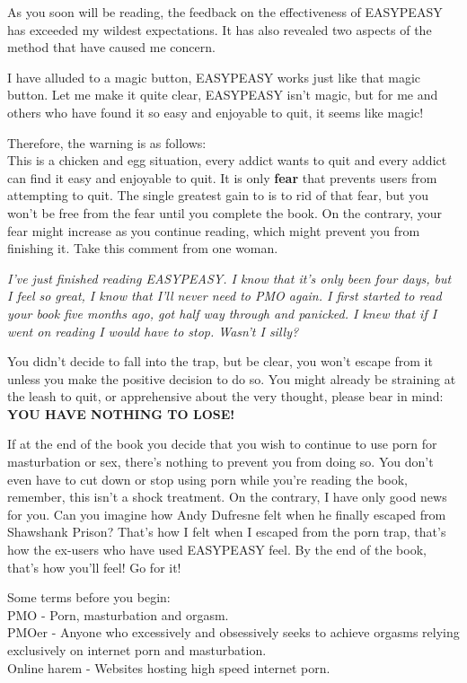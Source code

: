 \documentclass[easypeasy.tex]{subfiles}
\begin{document}
As you soon will be reading, the feedback on the effectiveness of EASYPEASY has exceeded my wildest expectations. It has also revealed two aspects of the method that have caused me concern. 

I have alluded to a magic button, EASYPEASY works just like that magic button. Let me make it quite clear, EASYPEASY isn't magic, but for me and others who have found it so easy and enjoyable to quit, it seems like magic!

Therefore, the warning is as follows:\\
This is a chicken and egg situation, every addict wants to quit and every addict can find it easy and enjoyable to quit. It is only \textbf{fear} that prevents users from attempting to quit. The single greatest gain to is to rid of that fear, but you won't be free from the fear until you complete the book. On the contrary, your fear might increase as you continue reading, which might prevent you from finishing it. Take this comment from one woman.

\textit{\textit{I've just finished reading EASYPEASY. I know that it's only been four days, but I feel so great, I know that I'll never need to PMO again. I first started to read your book five months ago, got half way through and panicked. I knew that if I went on reading I would have to stop. Wasn't I silly?}}

You didn't decide to fall into the trap, but be clear, you won't escape from it unless you make the positive decision to do so. You might already be straining at the leash to quit, or apprehensive about the very thought, please bear in mind: 
\textbf{YOU HAVE NOTHING TO LOSE!}

If at the end of the book you decide that you wish to continue to use porn for masturbation or sex, there's nothing to prevent you from doing so. You don't even have to cut down or stop using porn while you're reading the book, remember, this isn't a shock treatment. On the contrary, I have only good news for you. Can you imagine how Andy Dufresne felt when he finally escaped from Shawshank Prison? That's how I felt when I escaped from the porn trap, that's how the ex-users who have used EASYPEASY feel. By the end of the book, that's how you'll feel! Go for it!

Some terms before you begin:\\
  PMO - Porn, masturbation and orgasm.\\
  PMOer - Anyone who excessively and obsessively seeks to achieve orgasms relying exclusively on internet porn and masturbation.\\
  Online harem - Websites hosting high speed internet porn.
\end{document}
